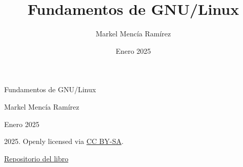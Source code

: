 \documentclass[a4paper,12pt,oneside]{book}
\title{Fundamentos de GNU/Linux}
\author{Markel Mencía Ramírez}
\date{Enero 2025}
\begin{document}
\begin{titlepage}
    \centering
    \vspace*{\fill}
    {\Huge Fundamentos de GNU/Linux\par}
    \vspace{1.5cm}
    {\Large Markel Mencía Ramírez\par}
    \vspace{1cm}
    {\large Enero 2025\par}

    \vfill
    \begin{minipage}{\textwidth}
        \centering
        {\small 2025. Openly licensed via \href{https://creativecommons.org/licenses/by-sa/4.0/}{CC BY-SA}.\par}

        {\small \href{https://github.com/markelmencia/fundamentos-gnulinux}{Repositorio del libro}\par}
    \end{minipage}
    
\end{titlepage}

\tableofcontents







\end{document}
